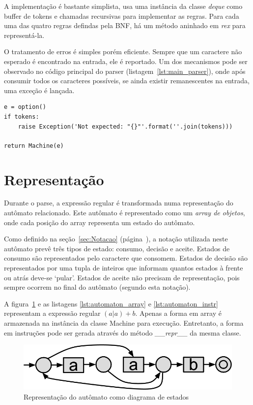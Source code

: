 \documentclass[a4paper,12pt,oneside,onecolumn]{uerj}
\begin{document}
A implementação é bastante simplista, usa uma instância da classe \emph{deque} como buffer de tokens e chamadas recursivas para implementar as regras. Para cada uma das quatro regras defindas pela BNF, há um método aninhado em \emph{rex} para representá-la.

O tratamento de erros é simples porém eficiente. Sempre que um caractere não esperado é encontrado na entrada, ele é reportado. Um dos mecanismos pode ser observado no código principal do parser (listagem~\ref{lst:main_parser}), onde após consumir todos os caracteres possíveis, se ainda existir remanescentes na entrada, uma exceção é lançada.

\vspace{0.5cm}
\begin{lstlisting}[caption={Implementação top-level do parser},label=lst:main_parser]
e = option()
if tokens: 
    raise Exception('Not expected: "{}"'.format(''.join(tokens)))

return Machine(e)
\end{lstlisting}

\section{Representação}

Durante o parse, a expressão regular é transformada numa representação do autômato relacionado. Este autômato é representado como um \emph{array de objetos}, onde cada posição do array representa um estado do autômato.

Como definido na seção~\ref{sec:Notacao} (página~\pageref{sec:Notacao}), a notação utilizada neste autômato prevê três tipos de estado: consumo, decisão e aceite. Estados de consumo são representados pelo caractere que consomem. Estados de decisão são representados por uma tupla de inteiros que informam quantos estados à frente ou atrás deve-se `pular'. Estados de aceite não precisam de representação, pois sempre ocorrem no final do autômato (segundo esta notação).

A figura~\ref{fig:exemplo_automato_puro} e as listagens \ref{lst:automaton_array} e \ref{lst:automaton_instr} representam a expressão regular $(a|a)+b$. Apenas a forma em array é armazenada na instância da classe Machine para execução. Entretanto, a forma em instruções pode ser gerada através do método \emph{\_\_repr\_\_} da mesma classe.

\begin{figure}[ht]
  \centering
  \includegraphics[scale=0.4]{figures/exemplo_automato_puro.png}
  \caption{Representação do autômato como diagrama de estados}
  \label{fig:exemplo_automato_puro}
\end{figure}
\end{document}
